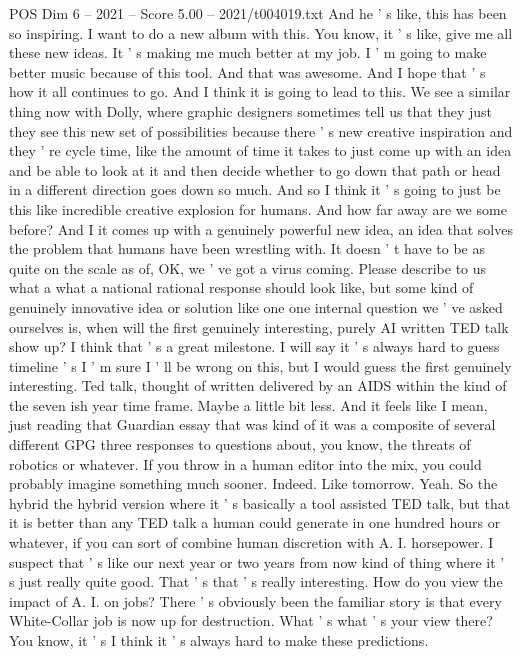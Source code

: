 \begin{textsample}{POS Dim 6 – 2021 – Score 5.00 – 2021/t004019.txt}
And he ' s like, this has been so inspiring.
I want to do a new album with this.
You know, it ' s like, give me all these new ideas.
It ' s making me much better at my job.
I ' m going to make better music because of this tool.
And that was awesome.
And I hope that ' s how it all continues to go.
And I think it is going to lead to this.
We see a similar thing now with Dolly, where graphic designers sometimes tell us that they just they see this new set of possibilities because there ' s new creative inspiration and they ' re cycle time, like the amount of time it takes to just come up with an idea and be able to look at it and then decide whether to go down that path or head in a different direction goes down so much.
And so I think it ' s going to just be this like incredible creative explosion for humans.
And how far away are we some before?
And I it comes up with a genuinely powerful new idea, an idea that solves the problem that humans have been wrestling with.
It doesn ' t have to be as quite on the scale as of, OK, we ' ve got a virus coming.
Please describe to us what a what a national rational response should look like, but some kind of genuinely innovative idea or solution like one one internal question we ' ve asked ourselves is, when will the first genuinely interesting, purely AI written TED talk show up?
I think that ' s a great milestone.
I will say it ' s always hard to guess timeline ' s I ' m sure I ' ll be wrong on this, but I would guess the first genuinely interesting.
Ted talk, thought of written delivered by an AIDS within the kind of the seven ish year time frame.
Maybe a little bit less.
And it feels like I mean, just reading that Guardian essay that was kind of it was a composite of several different GPG three responses to questions about, you know, the threats of robotics or whatever.
If you throw in a human editor into the mix, you could probably imagine something much sooner.
Indeed.
Like tomorrow.
Yeah.
So the hybrid the hybrid version where it ' s basically a tool assisted TED talk, but that it is better than any TED talk a human could generate in one hundred hours or whatever, if you can sort of combine human discretion with A.
I. horsepower.
I suspect that ' s like our next year or two years from now kind of thing where it ' s just really quite good.
That ' s that ' s really interesting.
How do you view the impact of A.
I. on jobs?
There ' s obviously been the familiar story is that every White-Collar job is now up for destruction.
What ' s what ' s your view there?
You know, it ' s I think it ' s always hard to make these predictions.

\end{textsample}
